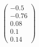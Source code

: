 \documentclass[preview]{standalone}
\begin{document}
\begin{align*}
\begin{pmatrix} -0.5 \\ -0.76 \\ 0.08 \\ 0.1 \\ 0.14 \end{pmatrix}
\end{align*}
\end{document}
